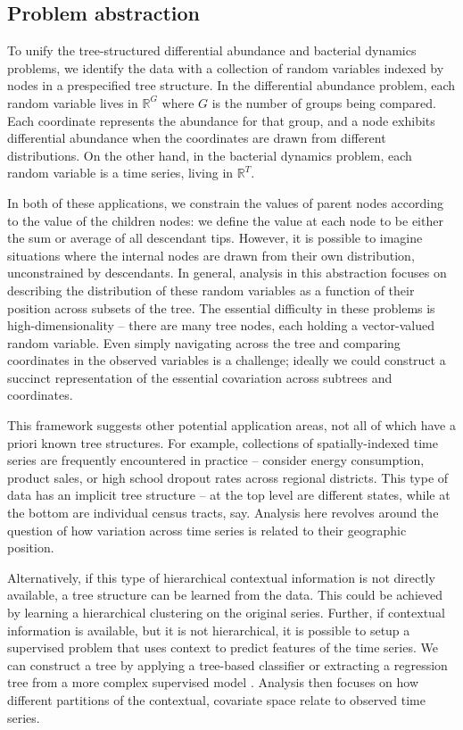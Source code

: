 \subsection{Problem abstraction}\label{problem-abstraction}

To unify the tree-structured differential abundance and bacterial dynamics
problems, we identify the data with a collection of random variables indexed by
nodes in a prespecified tree structure. In the differential abundance problem,
each random variable lives in $\mathbb{R}^{G}$ where $G$ is the number of
groups being compared. Each coordinate represents the abundance for that group,
and a node exhibits differential abundance when the coordinates are drawn from
different distributions. On the other hand, in the bacterial dynamics problem,
each random variable is a time series, living in $\mathbb{R}^{T}$.

In both of these applications, we constrain the values of parent nodes according
to the value of the children nodes: we define the value at each node to be
either the sum or average of all descendant tips. However, it is possible to
imagine situations where the internal nodes are drawn from their own
distribution, unconstrained by descendants. In general, analysis in this
abstraction focuses on describing the distribution of these random variables as
a function of their position across subsets of the tree. The essential
difficulty in these problems is high-dimensionality -- there are many tree
nodes, each holding a vector-valued random variable. Even simply navigating
across the tree and comparing coordinates in the observed variables is a
challenge; ideally we could construct a succinct representation of the essential
covariation across subtrees and coordinates.

This framework suggests other potential application areas, not all of which have
a priori known tree structures. For example, collections of spatially-indexed
time series are frequently encountered in practice -- consider energy
consumption, product sales, or high school dropout rates across regional
districts. This type of data has an implicit tree structure -- at the top level
are different states, while at the bottom are individual census tracts, say.
Analysis here revolves around the question of how variation across time series
is related to their geographic position.

Alternatively, if this type of hierarchical contextual information is not
directly available, a tree structure can be learned from the data. This could be
achieved by learning a hierarchical clustering on the original series. Further,
if contextual information is available, but it is not hierarchical, it is
possible to setup a supervised problem that uses context to predict features of
the time series. We can construct a tree by applying a tree-based classifier
\citep{breiman1984classification} or extracting a regression tree from a more
complex supervised model \citep{boz2002extracting,saito2002extracting}. Analysis
then focuses on how different partitions of the contextual, covariate space
relate to observed time series.

